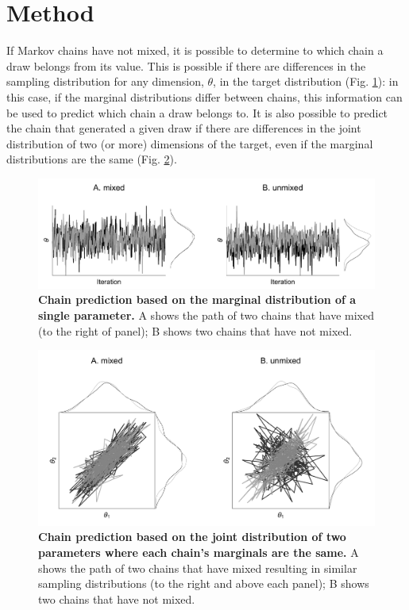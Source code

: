 \documentclass{article}
\begin{document}
\section{Method}\label{sec:method}
If Markov chains have not mixed, it is possible to determine to which chain a draw belongs from its value. This is possible if there are differences in the sampling distribution for any dimension, $\theta$, in the target distribution (Fig. \ref{fig:marginal}): in this case, if the marginal distributions differ between chains, this information can be used to predict which chain a draw belongs to. It  is also possible to predict the chain that generated a given draw if there are differences in the joint distribution of two (or more) dimensions of the target, even if the marginal distributions are the same (Fig. \ref{fig:joint}).

\begin{figure}[!htb]
	\centerline{\includegraphics[width=1.0\textwidth]{../output/unmixed_1.pdf}}
	\caption{\textbf{Chain prediction based on the marginal distribution of a single parameter.} A shows the path of two chains that have mixed (to the right of panel); B shows two chains that have not mixed.}
	\label{fig:marginal}
\end{figure}

\begin{figure}[h]
	\centerline{\includegraphics[width=1.0\textwidth]{../output/unmixed_2.pdf}}
	\caption{\textbf{Chain prediction based on the joint distribution of two parameters where each chain's marginals are the same.} A shows the path of two chains that have mixed resulting in similar sampling distributions (to the right and above each panel); B shows two chains that have not mixed.}
	\label{fig:joint}
\end{figure}
\end{document}
